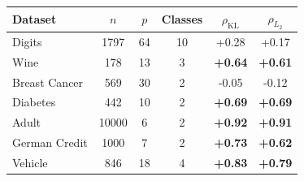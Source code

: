 \begin{tabular}{lccccc}
\toprule
Dataset & $n$ & $p$ & Classes & $\rho_{\mathrm{KL}}$ & $\rho_{L_2}$ \\
\midrule
Digits & 1797 & 64 & 10 & +0.28 & +0.17 \\
Wine & 178 & 13 & 3 & \textbf{+0.64} & \textbf{+0.61} \\
Breast Cancer & 569 & 30 & 2 & -0.05 & -0.12 \\
Diabetes & 442 & 10 & 2 & \textbf{+0.69} & \textbf{+0.69} \\
Adult & 10000 & 6 & 2 & \textbf{+0.92} & \textbf{+0.91} \\
German Credit & 1000 & 7 & 2 & \textbf{+0.73} & \textbf{+0.62} \\
Vehicle & 846 & 18 & 4 & \textbf{+0.83} & \textbf{+0.79} \\
\bottomrule
\end{tabular}